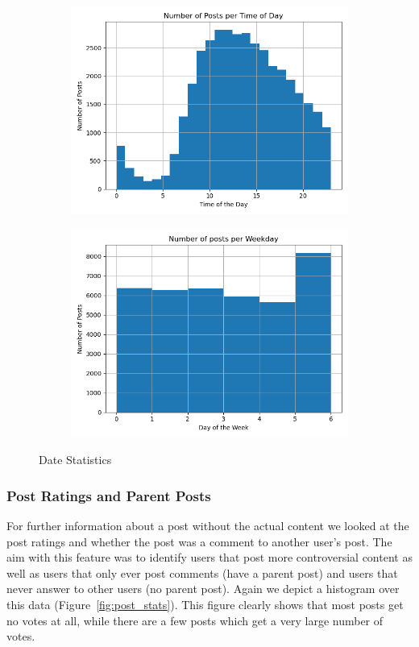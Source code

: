 \documentclass[acmsmall]{acmart}
\begin{document}
\begin{figure}[H]
\centering
\begin{subfigure}{.5\textwidth}
\centering
  \includegraphics[width=.9\linewidth]{assets/Number_of_posts_per_time_of_day.png}
 \end{subfigure}%
\begin{subfigure}{.5\textwidth}
\centering
  \includegraphics[width=.9\linewidth]{assets/Number_of_posts_per_day_of_week.png}
 \end{subfigure}
 \caption{Date Statistics}
\label{fig:date_stats}
\end{figure}

\subsubsection{Post Ratings and Parent Posts}
For further information about a post without the actual content we looked at the post ratings and whether the post was a comment to another user's post. The aim with this feature was to identify users that post more controversial content as well as users that only ever post comments (have a parent post) and users that never answer to other users (no parent post). Again we depict a histogram over this data (Figure~\ref{fig:post_stats}). This figure clearly shows that most posts get no votes at all, while there are a few posts which get a very large number of votes. 
\end{document}
